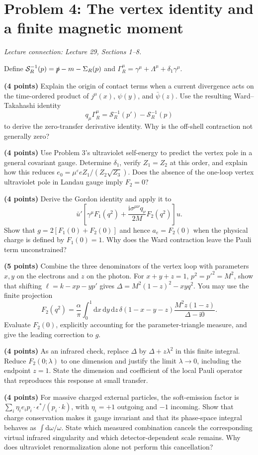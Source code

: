 \documentclass[11pt]{article}
\newcommand{\dd}{\mathrm d}
\newcommand{\ii}{\mathrm i}
\newcommand{\eps}{\varepsilon}
\newcommand{\problem}[2]{\clearpage\section*{\color{qftblue}Problem #1: #2}}
\newcommand{\connection}[1]{{\small\textit{Lecture connection: #1}\par}\medskip}
\begin{document}
\problem{4}{The vertex identity and a finite magnetic moment}
\connection{Lecture 29, Sections 1--8.}
Define \(\mathcal S_R^{-1}(p)=\slashed p-m-\Sigma_R(p)\) and
\(\Gamma_R^\mu=\gamma^\mu+\Lambda^\mu+\delta_1\gamma^\mu\).
\begin{parts}
\item \textbf{(4 points)} Explain the origin of contact terms when a
current divergence acts on the time-ordered product of \(j^\mu(x)\), \(\psi(y)\), and \(\bar\psi(z)\).
Use the resulting Ward--Takahashi identity
\[q_\mu\Gamma_R^\mu=\mathcal S_R^{-1}(p')-\mathcal S_R^{-1}(p)\]
to derive the zero-transfer derivative identity. Why is the off-shell
contraction not generally zero?

\item \textbf{(4 points)} Use Problem 3's ultraviolet self-energy to
predict the vertex pole in a general covariant gauge. Determine
\(\delta_1\), verify \(Z_1=Z_2\) at this order, and explain how this
reduces \(e_0=\mu^\eps eZ_1/(Z_2\sqrt{Z_3})\). Does the absence of the
one-loop vertex ultraviolet pole in Landau gauge imply \(F_2=0\)?

\item \textbf{(4 points)} Derive the Gordon identity and apply it to
\[
 \bar u'\left[\gamma^\mu F_1(q^2)
 +\frac{\ii\sigma^{\mu\nu}q_\nu}{2M}F_2(q^2)\right]u.
\]
Show that \(g=2[F_1(0)+F_2(0)]\) and hence
\(a_e=F_2(0)\) when the physical charge is defined by \(F_1(0)=1\).
Why does the Ward contraction leave the Pauli term unconstrained?

\item \textbf{(5 points)} Combine the three denominators of the vertex
loop with parameters \(x,y\) on the electrons and \(z\) on the photon.
For \(x+y+z=1\), \(p^2=p'^2=M^2\), show that shifting
\(\ell=k-xp-yp'\) gives
\(\Delta=M^2(1-z)^2-xyq^2\). You may use the finite projection
\[
 F_2(q^2)=\frac{\alpha}{\pi}\int_0^1\dd x\,\dd y\,\dd z\,
 \delta(1-x-y-z)\frac{M^2z(1-z)}{\Delta-\ii0}.
\]
Evaluate \(F_2(0)\), explicitly accounting for the parameter-triangle
measure, and give the leading correction to \(g\).

\item \textbf{(4 points)} As an infrared check, replace
\(\Delta\) by \(\Delta+z\lambda^2\) in this finite integral. Reduce
\(F_2(0;\lambda)\) to one dimension and justify the limit
\(\lambda\to0\), including the endpoint \(z=1\).
State the dimension and coefficient of the local Pauli operator that
reproduces this response at small transfer.

\item \textbf{(4 points)} For massive charged external particles, the
soft-emission factor is
\(\sum_i\eta_i e_i p_i\cdot\epsilon^*/(p_i\cdot k)\), with
\(\eta_i=+1\) outgoing and \(-1\) incoming.
Show that charge conservation makes it gauge invariant and that its
phase-space integral behaves as \(\int\dd\omega/\omega\).
State which measured combination cancels the corresponding virtual
infrared singularity and which detector-dependent scale remains.
Why does ultraviolet renormalization alone not perform this cancellation?
\end{parts}
\end{document}
